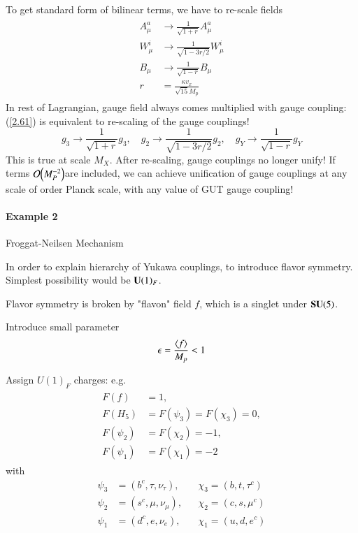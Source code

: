 To get standard form of bilinear terms, we have to re-scale fields
\begin{align}
   \begin{split}
      A_\mu^a &\rightarrow \frac{1}{\sqrt{1+ r}} A^a_\mu  \\
      W^i_\mu &\rightarrow \frac{1}{\sqrt{1-3r/2}} W_\mu^i  \\
      B_\mu &\rightarrow \frac{1}{\sqrt{1 - r}} B_\mu  \\
      r &= \frac{\kappa v_x}{\sqrt{15} M_p}
   \end{split}\label{2.61}
\end{align}
In rest of Lagrangian, gauge field always comes multiplied with gauge coupling: (\ref{2.61}) is equivalent to re-scaling of the gauge couplings!
\begin{equation}
   g_3 \rightarrow \frac{1}{\sqrt{1+r}} g_3, \quad g_2 \rightarrow \frac{1}{\sqrt{1-3r/2}} g_2, \quad g_Y \rightarrow \frac{1}{\sqrt{1-r}} g_Y
\end{equation}
This is true at scale $M_X$. After re-scaling, gauge couplings no longer unify! If terms $\order{M_P^{-2}}$are included, we can achieve unification of gauge couplings at any scale of order Planck scale, with any value of GUT gauge coupling!

\paragraph{Example 2} Froggat-Neilsen Mechanism

In order to explain hierarchy of Yukawa couplings, to introduce flavor symmetry. Simplest possibility would be $\mathbf{U}(1)_F$.

Flavor symmetry is broken by "flavon" field $f$, which is a singlet under $\mathbf{SU}(5)$.

Introduce small parameter 
\begin{equation}
   \epsilon = \frac{\expval{f}}{M_p} < 1 \label{2.63}
\end{equation}

Assign $U(1)_F$ charges: e.g.
\begin{align}
   \begin{split}
   F(f) &= 1, \\
   F(H_5) &= F(\psi_3) = F(\chi_3) = 0, \\
   F(\psi_2) &= F(\chi_2) = -1, \\
   F(\psi_1) &= F(\chi_1) = -2 \label{2.64}
   \end{split}
\end{align}
with
\begin{align*}
   \psi_3 &= (b^c, \tau, \nu_\tau), 
          &&\chi_3 = (b, t, \tau^c) \\
   \psi_2 &= (s^c, \mu, \nu_\mu ),
          && \chi_2 = (c,s,\mu^c) \\
   \psi_1 &= (d^c, e, \nu_e),
          && \chi_1 = (u, d, e^c)
\end{align*}

